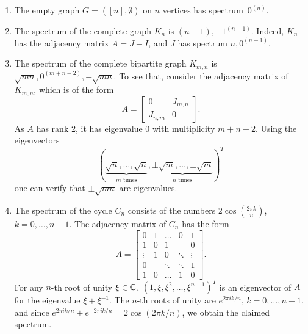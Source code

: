 \begin{example} \label{ex:special_spectra}
    \begin{enumerate}
        \item[(a)] The empty graph $G = ([n], \emptyset)$ on $n$ vertices has \mbox{spectrum $0^{(n)}$}.
        \item[(b)] The spectrum of the complete graph $K_n$ is $(n - 1), -1^{(n - 1)}$. 
            Indeed, $K_n$ has the adjacency matrix $A = J - I$, and $J$ has spectrum $n, 0^{(n - 1)}$.
        \item[(c)] The spectrum of the complete bipartite graph $K_{m,n}$ is $\sqrt{mn}, 0^{(m + n - 2)}, -\sqrt{mn}$.
            To see that, consider the adjacency matrix of $K_{m,n}$, which is of the form
            \begin{equation*}
                A = \begin{bmatrix}
                    0 & J_{m,n} \\ 
                    J_{n, m} & 0
                \end{bmatrix}.
            \end{equation*}
            As $A$ has rank 2, it has eigenvalue $0$ with multiplicity $m + n - 2$. 
            Using the eigenvectors
            \begin{equation*}
                (\underbrace{\sqrt{n}, \dots, \sqrt{n}}_{m \text{ times}}, \underbrace{\pm \sqrt{m}, \dots, \pm \sqrt{m}}_{n \text{ times}})^T
            \end{equation*}
            one can verify that $\pm \sqrt{mn}$ are eigenvalues.

        \item[(d)] The spectrum of the cycle $C_n$ consists of the numbers $2 \cos (\frac{2 \pi k}{n})$, $k = 0, \dots, n-1$.
            The adjacency matrix of $C_n$ has the form
            \begin{equation*}
                A = \begin{bmatrix}
                    0 & 1 & \dots & 0 & 1 \\
                    1 & 0 & 1 & & 0 \\ 
                    \vdots & 1 & 0 & \ddots & \vdots \\ 
                    0 & &\ddots & \ddots & 1 \\
                    1 & 0 & \dots & 1 & 0 
                \end{bmatrix}.
            \end{equation*}
            For any $n$-th root of unity $\xi \in \mathbb{C}$, $(1, \xi, \xi^2, \dots, \xi^{n - 1})^T$ is an eigenvector of $A$ for the eigenvalue $\xi + \xi^{-1}$.
            The $n$-th roots of unity are $e^{2 \pi i k /n}$, $k = 0, \dots, n - 1$, and since $e^{2 \pi i k / n} + e^{-2 \pi i k/n} = 2 \cos (2 \pi k / n)$, we obtain the claimed spectrum.


\end{enumerate}
\end{example}

